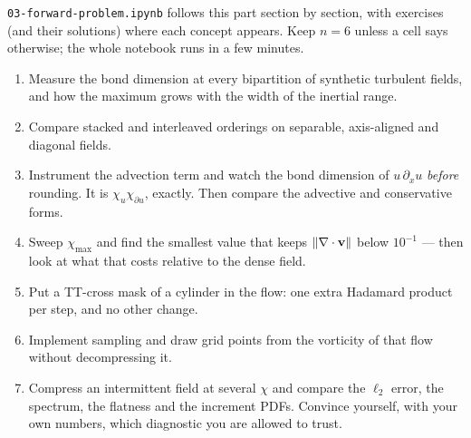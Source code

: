 \begin{exercise}
  \texttt{03-forward-problem.ipynb} follows this part section by section, with
  exercises (and their solutions) where each concept appears. Keep $n = 6$
  unless a cell says otherwise; the whole notebook runs in a few minutes.

  \begin{enumerate}
    \item Measure the bond dimension at every bipartition of synthetic
      turbulent fields, and how the maximum grows with the width of the
      inertial range.
    \item Compare stacked and interleaved orderings on separable, axis-aligned
      and diagonal fields.
    \item Instrument the advection term and watch the bond dimension of
      $u\,\partial_x u$ \emph{before} rounding. It is $\chi_u \chi_{\partial u}$,
      exactly. Then compare the advective and conservative forms.
    \item Sweep $\chi_{\max}$ and find the smallest value that keeps
      $\left\|\nabla\cdot\mathbf{v}\right\|$ below $10^{-1}$ --- then look at what that
      costs relative to the dense field.
    \item Put a TT-cross mask of a cylinder in the flow: one extra Hadamard
      product per step, and no other change.
    \item Implement sampling and draw grid points from the vorticity of that
      flow without decompressing it.
    \item Compress an intermittent field at several $\chi$ and compare the
      $\ell_2$ error, the spectrum, the flatness and the increment PDFs.
      Convince yourself, with your own numbers, which diagnostic you are allowed
      to trust.
  \end{enumerate}
\end{exercise}
